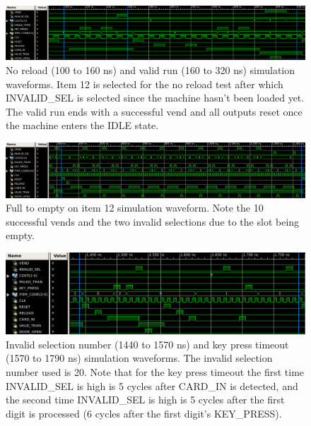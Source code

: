 \documentclass{article}
\begin{document}
\begin{figure}[H]
    \centering
    \includegraphics[scale=0.33]{../figs/sim1_2.png}
    \caption{No reload (100 to 160 ns) and valid run (160 to 320 ns) simulation waveforms. Item 12 is selected for the no reload test after which INVALID\_SEL is selected since the machine hasn't been loaded yet. The valid run ends with a successful vend and all outputs reset once the machine enters the IDLE state.}
    \label{fig:sim1_2}
\end{figure}

\begin{figure}[H]
    \centering
    \includegraphics[scale=0.35]{../figs/sim3.png}
    \caption{Full to empty on item 12 simulation waveform. Note the 10 successful vends and the two invalid selections due to the slot being empty.}
    \label{fig:sim3}
\end{figure}

\begin{figure}[H]
    \centering
    \includegraphics[scale=0.35]{../figs/sim4_5.png}
    \caption{Invalid selection number (1440 to 1570 ns) and key press timeout (1570 to 1790 ns) simulation waveforms. The invalid selection number used is 20. Note that for the key press timeout the first time INVALID\_SEL is high is 5 cycles after CARD\_IN is detected, and the second time INVALID\_SEL is high is 5 cycles after the first digit is processed (6 cycles after the first digit's KEY\_PRESS).}
    \label{fig:sim4_5}
\end{figure}
\end{document}
